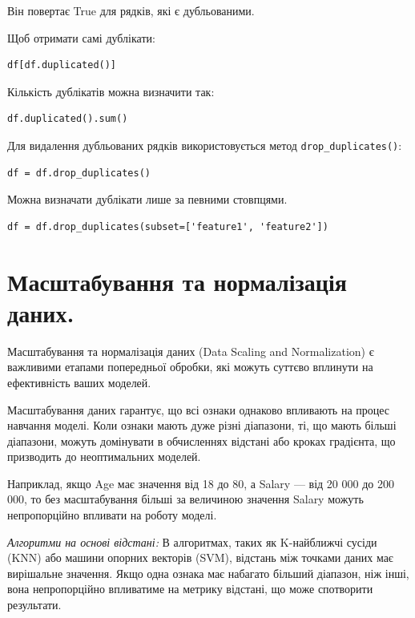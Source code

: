 Він повертає True для рядків, які є дубльованими.

Щоб отримати самі дублікати:

\begin{lstlisting}
df[df.duplicated()]
\end{lstlisting}

Кількість дублікатів можна визначити так:

\begin{lstlisting}
df.duplicated().sum()
\end{lstlisting}

Для видалення дубльованих рядків використовується метод \verb|drop_duplicates()|:

\begin{lstlisting}
df = df.drop_duplicates()
\end{lstlisting}

Можна визначати дублікати лише за певними стовпцями.

\begin{lstlisting}
df = df.drop_duplicates(subset=['feature1', 'feature2'])
\end{lstlisting}



\section{Масштабування та нормалізація даних.}

Масштабування та нормалізація даних (Data Scaling and Normalization) є важливими етапами попередньої обробки, які можуть суттєво 
вплинути на ефективність ваших моделей.

Масштабування даних гарантує, що всі ознаки однаково впливають на процес навчання моделі. 
Коли ознаки мають дуже різні діапазони, ті, що мають більші діапазони, можуть домінувати в 
обчисленнях відстані або кроках градієнта, що призводить до неоптимальних моделей.

Наприклад, якщо Age має значення від 18 до 80, а Salary — від 20 000 до 200 000, то без масштабування більші за величиною значення Salary можуть непропорційно впливати на роботу моделі.

\textit{Алгоритми на основі відстані:} В алгоритмах, таких як K-найближчі сусіди (KNN) або машини 
опорних векторів (SVM), відстань між точками даних має вирішальне значення. Якщо одна ознака 
має набагато більший діапазон, ніж інші, вона непропорційно впливатиме на метрику відстані, 
що може спотворити результати.

